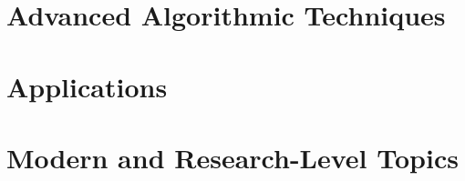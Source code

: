\documentclass[11pt,a4paper,twoside]{book}
\begin{document}
\part{Advanced Algorithmic Techniques}





\part{Applications}




\begingroup
\let\chapter\section

\endgroup

\part{Modern and Research-Level Topics}



\begingroup
\let\chapter\section

\endgroup

\appendix








\backmatter




\printindex
\end{document}
